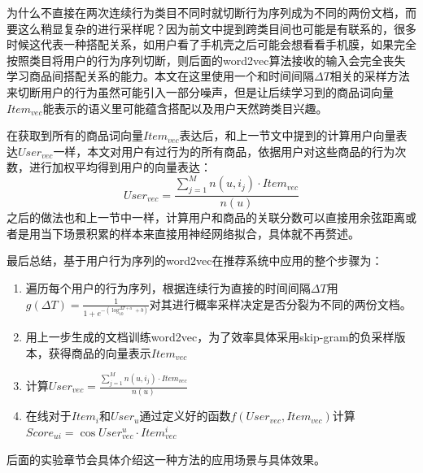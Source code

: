 为什么不直接在两次连续行为类目不同时就切断行为序列成为不同的两份文档，而要这么稍显复杂的进行采样呢？因为前文中提到跨类目间也可能是有联系的，很多时候这代表一种搭配关系，如用户看了手机壳之后可能会想看看手机膜，如果完全按照类目将用户的行为序列切断，则后面的word2vec算法接收的输入会完全丧失学习商品间搭配关系的能力。本文在这里使用一个和时间间隔$\Delta T$相关的采样方法来切断用户的行为虽然可能引入一部分噪声，但是让后续学习到的商品词向量$Item_{vec}$能表示的语义里可能蕴含搭配以及用户天然跨类目兴趣。

在获取到所有的商品词向量$Item_{vec}$表达后，和上一节文中提到的计算用户向量表达$User_{vec}$一样，本文对用户有过行为的所有商品，依据用户对这些商品的行为次数，进行加权平均得到用户的向量表达：
\begin{equation}
User_{vec} = \frac{\sum_{j=1}^M n(u,i_j) \cdot Item_{vec}}{n(u)}
\end{equation}
之后的做法也和上一节中一样，计算用户和商品的关联分数可以直接用余弦距离或者是用当下场景积累的样本来直接用神经网络拟合，具体就不再赘述。

最后总结，基于用户行为序列的word2vec在推荐系统中应用的整个步骤为：
\begin{enumerate}[步骤 1.]
\item 遍历每个用户的行为序列，根据连续行为直接的时间间隔$\Delta T$用$g(\Delta T) = \frac{1}{1 + e^{- (\log_{10}^{\Delta T + a} + b)}}$对其进行概率采样决定是否分裂为不同的两份文档。
\item 用上一步生成的文档训练word2vec，为了效率具体采用skip-gram的负采样版本，获得商品的向量表示$Item_{vec}$
\item 计算$User_{vec} = \frac{\sum_{j=1}^M n(u,i_j) \cdot Item_{vec}}{n(u)}$
\item 在线对于$Item_i$和$User_u$通过定义好的函数$f(User_{vec}, Item_{vec})$计算$Score_{ui} = \cos User_{vec}^u \cdot Item_{vec}^i$
\end{enumerate}

后面的实验章节会具体介绍这一种方法的应用场景与具体效果。


